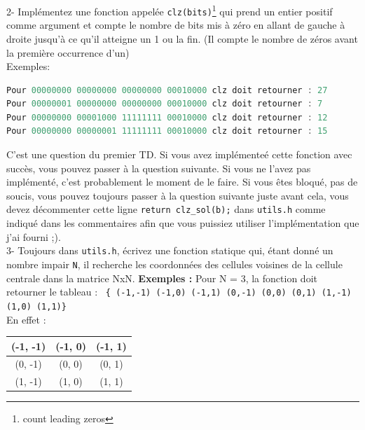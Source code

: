 \documentclass[a4paper]{article}
\begin{document}
	2- Implémentez une fonction appelée \texttt{clz(bits)}\footnote{count leading zeros} qui prend un entier positif comme argument et compte le nombre de bits mis à zéro en allant de gauche à droite jusqu'à ce qu'il atteigne un 1 ou la fin. (Il compte le nombre de zéros avant la première occurrence d'un) \\
	Exemples:
	\begin{lstlisting}[language=C]
Pour 00000000 00000000 00000000 00010000 clz doit retourner : 27
Pour 00000001 00000000 00000000 00010000 clz doit retourner : 7
Pour 00000000 00001000 11111111 00010000 clz doit retourner : 12
Pour 00000000 00000001 11111111 00010000 clz doit retourner : 15
	\end{lstlisting}
 	C'est une question du premier TD. Si vous avez implémenteé cette fonction avec succès, vous pouvez passer à la question suivante. Si vous ne l'avez pas implémenté, c'est probablement le moment de le faire. Si vous êtes bloqué, pas de soucis, vous pouvez toujours passer à la question suivante juste avant cela, vous devez décommenter cette ligne \texttt{return clz\_sol(b);} dans \texttt{utils.h} comme indiqué dans les commentaires afin que vous puissiez utiliser l'implémentation que j'ai fourni ;). \\
	
	3- Toujours dans \texttt{utils.h}, écrivez une fonction statique qui, étant donné un nombre impair \texttt{N}, il recherche les coordonnées des cellules voisines de la cellule centrale dans la matrice NxN.
	\textbf{Exemples :}
	Pour N = 3, la fonction doit retourner le tableau : \texttt{ \{ (-1,-1) (-1,0) (-1,1) (0,-1) (0,0) (0,1) (1,-1) (1,0) (1,1)\} } \\
	En effet : 
	\begin{center}
		\begin{tabular}{ | c | c | c | } 
			\hline
			(-1, -1) & (-1, 0) & (-1, 1) \\
			\hline
			(0, -1) & (0, 0) & (0, 1) \\
			\hline
			(1, -1) & (1, 0) & (1, 1) \\
			\hline
		\end{tabular}
	\end{center}
	
\end{document}
